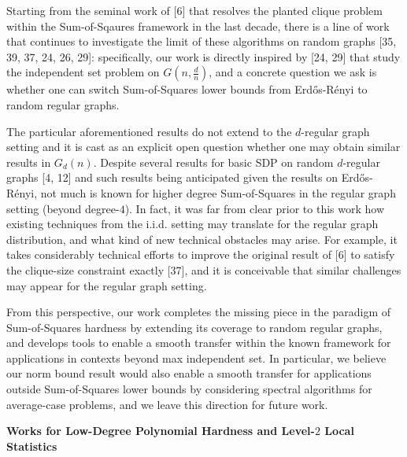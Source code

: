 Starting from the seminal work of [6] that resolves the planted clique problem within the Sum-of-Sqaures framework in the last decade, there is a line of work that continues to investigate the limit of these algorithms on random graphs [35, 39, 37, 24, 26, 29]: specifically, our work is directly inspired by [24, 29] that study the independent set problem on $G(n,\frac{d}{n})$, and a concrete question we ask is whether one can switch Sum-of-Squares lower bounds from Erdős-Rényi to random regular graphs.\par




The particular aforementioned results do not extend to the $d$-regular graph setting and it is cast as an explicit open question whether one may obtain similar results in $G_{d}(n)$. Despite several results for basic SDP on random $d$-regular graphs [4, 12] and such results being anticipated given the results on Erdős-Rényi, not much is known for higher degree Sum-of-Squares in the regular graph setting (beyond degree-$4$). In fact,
it was far from clear prior to this work how existing techniques from the i.i.d. setting may translate for the regular graph distribution, and what kind of new technical obstacles may arise. For example, it takes considerably technical efforts to improve the original result of [6] to satisfy the clique-size constraint exactly [37], and it is conceivable that similar challenges may appear for the regular graph setting.\par




From this perspective, our work completes the missing piece in the paradigm of Sum-of-Squares hardness by extending its coverage to random regular graphs, and develops tools to enable a smooth transfer within the known framework for applications in contexts beyond max independent set. In particular, we believe our norm bound result would also enable a smooth transfer for applications outside Sum-of-Squares lower bounds by considering spectral algorithms for average-case problems, and we leave this direction for future work.\par




\par\medskip\noindent\textbf{Works for Low-Degree Polynomial Hardness and Level-$2$ Local Statistics}\par




